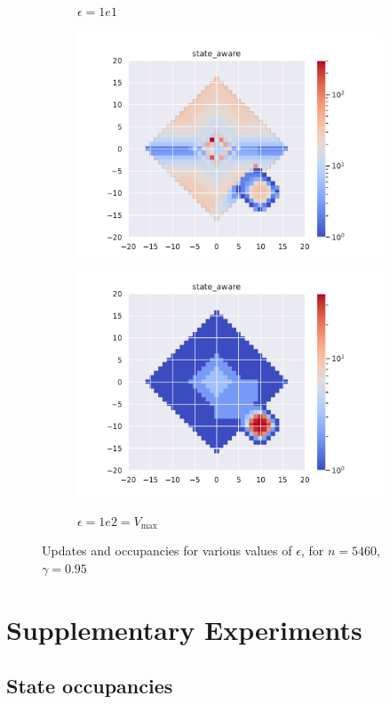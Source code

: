 \documentclass[runningheads]{llncs}
\begin{document}
\begin{figure}[H]
\begin{subfigure}[b]{\linewidth}
		\caption{$\epsilon=1e1$}
	\end{subfigure}
	\begin{subfigure}[b]{\linewidth}
		\centering
		\includegraphics[width=0.49\linewidth]{img/epsilon/1e2/updates_state_aware.pdf}
		\includegraphics[width=0.49\linewidth]{img/epsilon/1e2/occupations_state_aware.pdf}
		\caption{$\epsilon=1e2 = V_{\max}$}
	\end{subfigure}
	\caption{Updates and occupancies for various values of $\epsilon$, for $n = 5460$, $\gamma=0.95$}
\end{figure}

\section{Supplementary Experiments}

\subsection{State occupancies}
\end{document}
